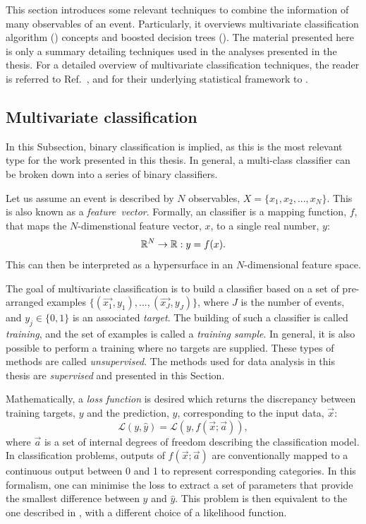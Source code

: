 This section introduces some relevant techniques to combine the information of many observables of an event. 
Particularly, it overviews multivariate classification algorithm (\MVA) concepts and boosted decision trees (). 
The material presented here is only a summary detailing techniques used in the analyses presented in the thesis.
For a detailed overview of multivariate classification techniques, the reader is referred to Ref.~\cite{Behnke:2013pga}, and for their underlying statistical framework to \cite{Hastie_Tibshirani_Friedman_2001,bishop_2016}.

\subsection{Multivariate classification}

In this Subsection, binary classification is implied, as this is the most relevant type for the work presented in this thesis. 
In general, a multi-class \MVA classifier can be broken down into a series of binary \MVA classifiers.

Let us assume an event is described by $N$ observables, $X=\{x_1,x_2,...,x_N\}$. This is also known as a \textit{feature~vector}.
Formally, an \MVA classifier is a mapping function, $f$, that maps the $N$-dimenstional feature vector, $x$, to a single real number, $y$:
\begin{equation}
    \mathbb{R}^N \rightarrow \mathbb{R}: y = f(x).
\end{equation}
This can then be interpreted as a hypersurface in an $N$-dimensional feature space.

The goal of multivariate classification is to build a classifier based on a set of pre-arranged examples $\{(\vec{x_1},y_1),..., (\vec{x_J},y_J)\}$, where $J$ is the number of events, and $y_j\in\{0,1\}$ is an associated \textit{target}.
The building of such a classifier is called \textit{training}, and the set of examples is called a \textit{training sample}.
In general, it is also possible to perform a training where no targets are supplied. 
These types of methods are called \textit{unsupervised}.
The methods used for data analysis in this thesis are \textit{supervised} and presented in this Section.

Mathematically, a \textit{loss function} is desired which returns the discrepancy between training targets, $y$ and the prediction, $\hat{y}$, corresponding to the input data, $\vec{x}$:
\begin{equation}\label{eq:loss_function}
    \mathcal{L}(y, \hat{y}) = \mathcal{L}(y, f(\vec{x};\vec{a})),
\end{equation}
where $\vec{a}$ is a set of internal degrees of freedom describing the classification model.
In classification problems, outputs of $f(\vec{x};\vec{a})$ are conventionally mapped to a continuous output between 0 and 1 to represent corresponding categories.
In this formalism, one can minimise the loss to extract a set of parameters that provide the smallest difference between $y$ and $\hat{y}$.
This problem is then equivalent to the one described in , with a different choice of a likelihood function.


